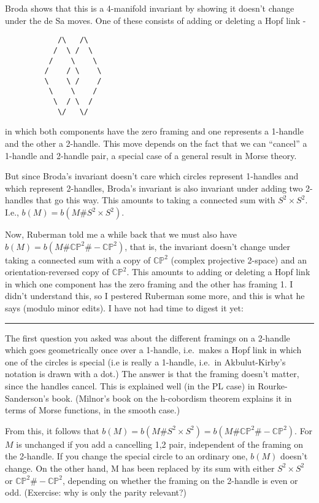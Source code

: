 \documentclass{article}
\begin{document}
Broda shows that this is a 4-manifold invariant by showing it doesn't
change under the de Sa moves. One of these consists of adding or
deleting a Hopf link -

\begin{verbatim}
            /\   /\
           /  \ /  \
          /    \    \       
         /    / \    \       
         \    \ /    /
          \    \    /
           \  / \  /
            \/   \/
\end{verbatim}

in which both components have the zero framing and one represents a
1-handle and the other a 2-handle. This move depends on the fact that we
can ``cancel'' a 1-handle and 2-handle pair, a special case of a general
result in Morse theory.

But since Broda's invariant doesn't care which circles represent
1-handles and which represent 2-handles, Broda's invariant is also
invariant under adding two 2-handles that go this way. This amounts to
taking a connected sum with \(S^2 \times S^2\). I.e.,
\(b(M) = b(M\# S^2 \times S^2)\).

Now, Ruberman told me a while back that we must also have
\(b(M) = b(M\#\mathbb{CP}^2\#-\mathbb{CP}^2)\), that is, the invariant
doesn't change under taking a connected sum with a copy of
\(\mathbb{CP}^2\) (complex projective 2-space) and an
orientation-reversed copy of \(\mathbb{CP}^2\). This amounts to adding
or deleting a Hopf link in which one component has the zero framing and
the other has framing 1. I didn't understand this, so I pestered
Ruberman some more, and this is what he says (modulo minor edits). I
have not had time to digest it yet:

\begin{center}\rule{0.5\linewidth}{0.5pt}\end{center}

The first question you asked was about the different framings on a
2-handle which goes geometrically once over a 1-handle, i.e.~makes a
Hopf link in which one of the circles is special (i.e is really a
1-handle, i.e.~in Akbulut-Kirby's notation is drawn with a dot.) The
answer is that the framing doesn't matter, since the handles cancel.
This is explained well (in the PL case) in Rourke-Sanderson's book.
(Milnor's book on the h-cobordism theorem explains it in terms of Morse
functions, in the smooth case.)

From this, it follows that
\(b(M) = b(M\#S^2 \times S^2) = b(M\#\mathbb{CP}^2\#-\mathbb{CP}^2)\).
For \(M\) is unchanged if you add a cancelling 1,2 pair, independent of
the framing on the 2-handle. If you change the special circle to an
ordinary one, \(b(M)\) doesn't change. On the other hand, M has been
replaced by its sum with either \(S^2 \times S^2\) or
\(\mathbb{CP}^2 \# -\mathbb{CP}^2\), depending on whether the framing on
the 2-handle is even or odd. (Exercise: why is only the parity
relevant?)
\end{document}
